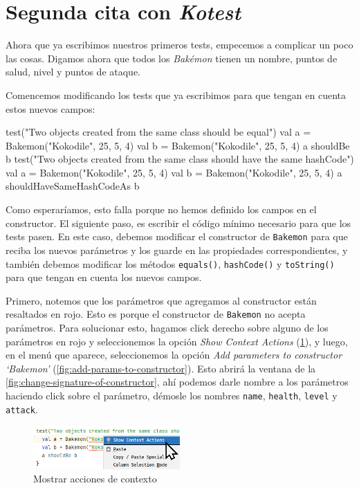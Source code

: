 \section{Segunda cita con \textit{Kotest}}
\label{sec:kotest-2}
  
  Ahora que ya escribimos nuestros primeros tests, empecemos a complicar un poco las cosas.
  Digamos ahora que todos los \textit{Bakémon} tienen un nombre, puntos de salud, nivel y puntos de
  ataque.

  Comencemos modificando los tests que ya escribimos para que tengan en cuenta estos nuevos campos:

  \begin{kotlin}
    test("Two objects created from the same class should be equal") {
      val a = Bakemon("Kokodile", 25, 5, 4)
      val b = Bakemon("Kokodile", 25, 5, 4)
      a shouldBe b
    }
    test("Two objects created from the same class should have the same hashCode") {
      val a = Bakemon("Kokodile", 25, 5, 4)
      val b = Bakemon("Kokodile", 25, 5, 4)
      a shouldHaveSameHashCodeAs b
    }
  \end{kotlin}

  Como esperaríamos, esto falla porque no hemos definido los campos en el constructor.
  El siguiente paso, es escribir el código mínimo necesario para que los tests pasen.
  En este caso, debemos modificar el constructor de \texttt{Bakemon} para que reciba los nuevos
  parámetros y los guarde en las propiedades correspondientes, y también debemos modificar los 
  métodos \texttt{equals()}, \texttt{hashCode()} y \texttt{toString()} para que tengan en cuenta
  los nuevos campos.
  
  Primero, notemos que los parámetros que agregamos al constructor están resaltados en rojo.
  Esto es porque el constructor de \texttt{Bakemon} no acepta parámetros.
  Para solucionar esto, hagamos click derecho sobre alguno de los parámetros en rojo y seleccionemos
  la opción \textit{Show Context Actions} (\cref{fig:show-context-actions}), y luego, en el menú que
  aparece, seleccionemos la opción \textit{Add parameters to constructor `Bakemon'} 
  (\cref{fig:add-params-to-constructor}).
  Esto abrirá la ventana de la \cref{fig:change-signature-of-constructor}, ahí podemos darle nombre
  a los parámetros haciendo click sobre el parámetro, démosle los nombres \texttt{name}, 
  \texttt{health}, \texttt{level} y \texttt{attack}.

  \begin{figure}[ht!]
    \centering
    \includegraphics[width=0.5\textwidth]{img/oop/tdd/kotest_2/show_context_actions.png}
    \caption{Mostrar acciones de contexto}
    \label{fig:show-context-actions}
  \end{figure}


